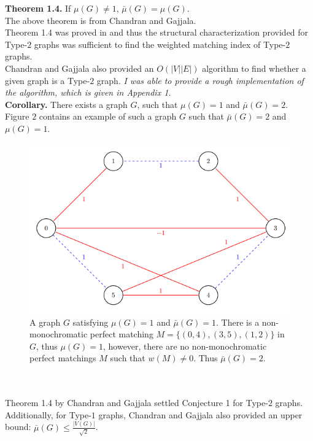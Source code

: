 \documentclass[11pt]{article}
\begin{document}
\textbf{Theorem 1.4.} If $\mu(G) \ne 1$, $\bar\mu(G)=\mu(G)$.\\
The above theorem is from Chandran and Gajjala\cite{chandran_gajjala1000}.\medskip\\
Theorem 1.4 was proved in \cite{chandran_gajjala1000} and thus the structural characterization provided for Type-$2$ graphs was sufficient to find the weighted matching index of Type-$2$ graphs.\\
Chandran and Gajjala also provided an $O(|V||E|)$ algorithm to find whether a given graph is a Type-$2$ graph. \textit{I was able to provide a rough implementation of the algorithm, which is given in Appendix 1.}\medskip\\
\textbf{Corollary.} There exists a graph $G$, such that $\mu(G)=1$ and $\bar\mu(G)=2$.\\
Figure $2$ contains an example of such a graph $G$ such that $\bar\mu(G)=2$ and $\mu(G)=1$. \\
\begin{figure}[h]
    \centering
    \includegraphics[scale=0.7]{images/mu_different.png}
    \caption{A graph $G$ satisfying $\mu(G)=1$ and $\bar\mu(G)=1$. There is a non-monochromatic perfect matching $M=\{(0,4),(3,5),(1,2)\}$ in $G$, thus $\mu(G)=1$, however, there are no non-monochromatic perfect matchings $M$ such that $w(M) \ne 0$. Thus $\bar\mu(G)=2$.}
    \label{fig:Figure-2}
\end{figure}\medskip\\\\
Theorem 1.4 by Chandran and Gajjala\cite{chandran_gajjala1000} settled Conjecture 1 for Type-$2$ graphs.\\
Additionally, for Type-$1$ graphs, Chandran and Gajjala\cite{cg2023root2} also provided an upper bound: $\bar\mu(G) \le \frac{\displaystyle|V(G)|}{\displaystyle\sqrt{2}}$.
\bigskip\\
\end{document}
